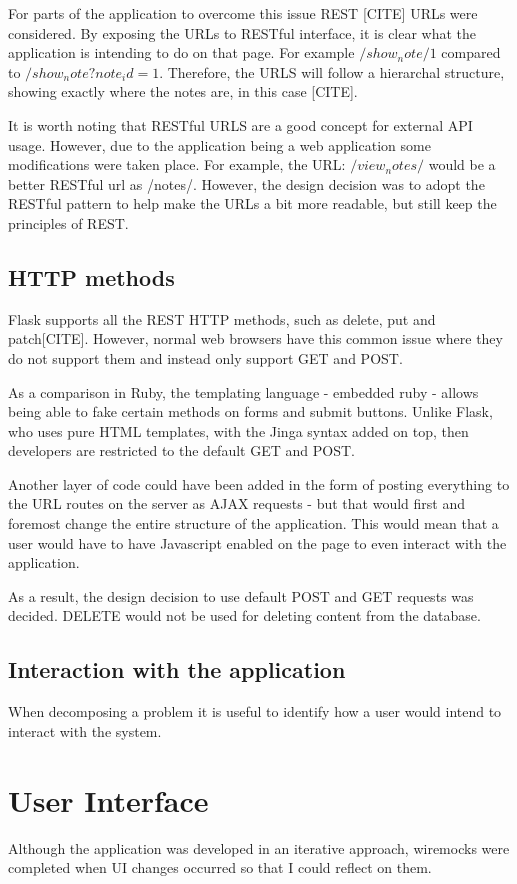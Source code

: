 For parts of the application to overcome this issue REST [CITE] URLs were considered. By exposing the URLs to RESTful interface, it is clear what the application is intending to do on that page. For example $/show_note/1$ compared to $/show_note?note_id=1$. Therefore, the URLS will follow a hierarchal structure, showing exactly where the notes are, in this case [CITE].

It is worth noting that RESTful URLS are a good concept for external API usage. However, due to the application being a web application some modifications were taken place. For example, the URL: $/view_notes/$ would be a better RESTful url as /notes/. However, the design decision was to adopt the RESTful pattern to help make the URLs a bit more readable, but still keep the principles of REST.

\subsection{HTTP methods}
Flask supports all the REST HTTP methods, such as delete, put and patch[CITE]. However, normal web browsers have this common issue where they do not support them and instead only support GET and POST.

As a comparison in Ruby, the templating language - embedded ruby - allows being able to fake certain methods on forms and submit buttons. Unlike Flask, who uses pure HTML templates, with the Jinga syntax added on top, then developers are restricted to the default GET and POST.

Another layer of code could have been added in the form of posting everything to the URL routes on the server as AJAX requests - but that would first and foremost change the entire structure of the application. This would mean that a user would have to have Javascript enabled on the page to even interact with the application.

As a result, the design decision to use default POST and GET requests was decided. DELETE would not be used for deleting content from the database.

\subsection{Interaction with the application}
When decomposing a problem it is useful to identify how a user would intend to interact with the system.





\section{User Interface}
Although the application was developed in an iterative approach, wiremocks were completed when UI changes occurred so that I could reflect on them.

